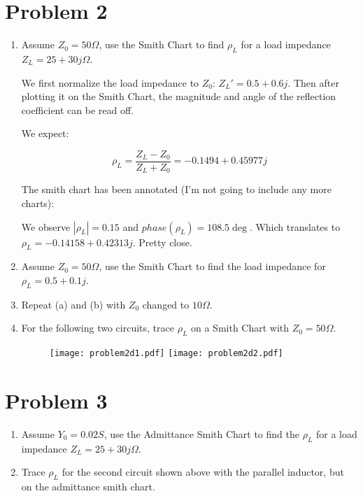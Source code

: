 \section*{Problem 2}
\begin{enumerate}[label=(\alph*)]
    \item Assume $Z_0 = 50\Omega$, use the Smith Chart to find $\rho_L$ for a load impedance $Z_L = 25 + 30j \Omega$.

    We first normalize the load impedance to $Z_0$: $Z_L' = 0.5 + 0.6j$. Then after plotting it on the Smith Chart, the magnitude and angle of the reflection coefficient can be read off.

    We expect:

    $$ \rho_L = \frac{Z_L - Z_0}{Z_L + Z_0} = -0.1494+0.45977j $$

    The smith chart has been annotated (I'm not going to include any more charts):


    We observe $|\rho_L| = 0.15$ and $phase(\rho_L) = 108.5 \deg$. Which translates to $\rho_L = -0.14158 + 0.42313j$. Pretty close.

    \item Assume $Z_0 = 50 \Omega$, use the Smith Chart to find the load impedance for $\rho_L = 0.5 + 0.1j$.

    \item Repeat (a) and (b) with $Z_0$ changed to $10\Omega$.

    \item For the following two circuits, trace $\rho_L$ on a Smith Chart with $Z_0 = 50\Omega$.

    \begin{figure}[H]
        \centering \texttt{[image: problem2d1.pdf]}
        \centering \texttt{[image: problem2d2.pdf]}
    \end{figure}
\end{enumerate}

\section*{Problem 3}

\begin{enumerate}[label=(\alph*)]
    \item Assume $Y_0 = 0.02S$, use the Admittance Smith Chart to find the $\rho_L$ for a load impedance $Z_L = 25 + 30j \Omega$.

    \item Trace $\rho_L$ for the second circuit shown above with the parallel inductor, but on the admittance smith chart.
\end{enumerate}

